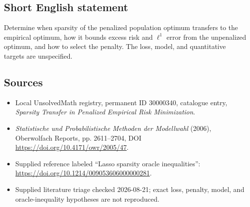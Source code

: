 \documentclass[11pt]{article}
\begin{document}
\subsection{Short English statement}
Determine when sparsity of the penalized population optimum transfers to the empirical optimum, how it bounds excess risk and \(\ell^1\) error from the unpenalized optimum, and how to select the penalty. The loss, model, and quantitative targets are unspecified.
\subsection{Sources}
\begin{itemize}
\item Local UnsolvedMath registry, permanent ID 30000340, catalogue entry, \emph{Sparsity Transfer in Penalized Empirical Risk Minimization}.
\item \emph{Statistische und Probabilistische Methoden der Modellwahl} (2006), Oberwolfach Reports, pp. 2611--2704, DOI \url{https://doi.org/10.4171/owr/2005/47}.
\item Supplied reference labeled ``Lasso sparsity oracle inequalities'': \url{https://doi.org/10.1214/009053606000000281}.
\item Supplied literature triage checked 2026-08-21; exact loss, penalty, model, and oracle-inequality hypotheses are not reproduced.
\end{itemize}
\end{document}
